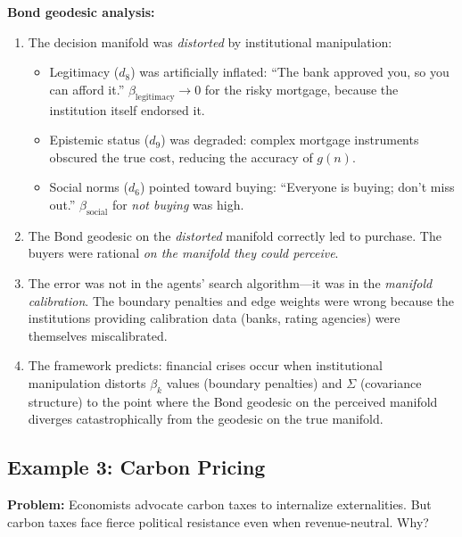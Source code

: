 \documentclass[12pt]{article}
\theoremstyle{definition}
\theoremstyle{remark}
\begin{document}
\textbf{Bond geodesic analysis:}
\begin{enumerate}
    \item The decision manifold was \emph{distorted} by institutional manipulation:
    \begin{itemize}
        \item Legitimacy ($d_8$) was artificially inflated: ``The bank approved you, so you can afford it.''  $\beta_{\text{legitimacy}} \to 0$ for the risky mortgage, because the institution itself endorsed it.
        \item Epistemic status ($d_9$) was degraded: complex mortgage instruments obscured the true cost, reducing the accuracy of $g(n)$.
        \item Social norms ($d_6$) pointed toward buying: ``Everyone is buying; don't miss out.''  $\beta_{\text{social}}$ for \emph{not buying} was high.
    \end{itemize}
    \item The Bond geodesic on the \emph{distorted} manifold correctly led to purchase.  The buyers were rational \emph{on the manifold they could perceive}.
    \item The error was not in the agents' search algorithm---it was in the \emph{manifold calibration}.  The boundary penalties and edge weights were wrong because the institutions providing calibration data (banks, rating agencies) were themselves miscalibrated.
    \item The framework predicts: financial crises occur when institutional manipulation distorts $\beta_k$ values (boundary penalties) and $\Sigma$ (covariance structure) to the point where the Bond geodesic on the perceived manifold diverges catastrophically from the geodesic on the true manifold.
\end{enumerate}

\subsection{Example 3: Carbon Pricing}

\textbf{Problem:} Economists advocate carbon taxes to internalize externalities.  But carbon taxes face fierce political resistance even when revenue-neutral.  Why?
\end{document}
